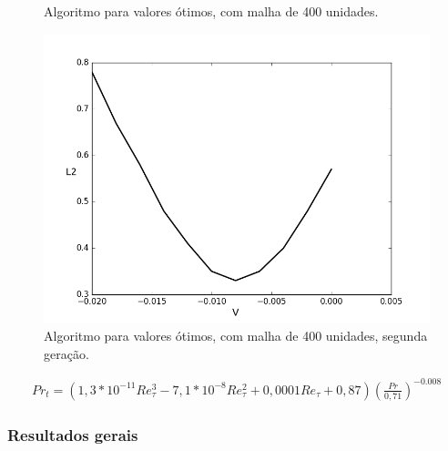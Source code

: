\documentclass[xcolor=dvipsnames,10pt,aspectratio=169]{beamer}
\begin{document}
\begin{frame}
\begin{minipage}[h!]{0.24\textwidth}
\begin{figure}
			\caption{Algoritmo para valores ótimos, com malha de 400 unidades.}
		\end{figure}
	\end{minipage}\hfill
\begin{minipage}[h!]{0.24\textwidth}
	\begin{figure}
		\centering
		\includegraphics[angle=0, scale=0.20]{A400zoon}
		\caption{Algoritmo para valores ótimos, com malha de 400 unidades, segunda geração.}
	\end{figure}
\end{minipage}	
	\begin{equation}
\begin{split}
Pr_t = \left( 1,3 * 10^{-11} Re_\tau^3 - 7,1 * 10^{-8} Re_\tau^2 + 0,0001 Re_\tau + 0,87 \right) \left(  \frac{Pr}{0,71}\right) ^{-0.008}
\end{split}
\end{equation}	
\end{frame}	
	
	
	
	
	
	
	
		\begin{frame}
		\frametitle{Resultados gerais}
		\begin{minipage}[h!]{0.45\textwidth}
		\end{minipage}\hfill
		\end{frame}
	
	
	
	
	
\end{document}
